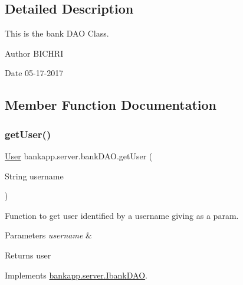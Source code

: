 \subsection{Detailed Description}
This is the bank D\+AO Class. 

\begin{DoxyAuthor}{Author}
B\+I\+C\+H\+RI 
\end{DoxyAuthor}
\begin{DoxyDate}{Date}
05-\/17-\/2017 
\end{DoxyDate}


\subsection{Member Function Documentation}
\mbox{\label{classbankapp_1_1server_1_1bankDAO_af952db62263ca6ebda3130336e63f941}} 
\subsubsection{\texorpdfstring{get\+User()}{getUser()}}
{\footnotesize\ttfamily \hyperlink{classbankapp_1_1server_1_1User}{User} bankapp.\+server.\+bank\+D\+A\+O.\+get\+User (\begin{DoxyParamCaption}\item[{String}]{username }\end{DoxyParamCaption})}



Function to get user identified by a username giving as a param. 


\begin{DoxyParams}{Parameters}
{\em username} & \\
\hline
\end{DoxyParams}
\begin{DoxyReturn}{Returns}
user 
\end{DoxyReturn}


Implements \hyperlink{interfacebankapp_1_1server_1_1IbankDAO_a11bbbf14695bce77b2932f36fdb79bd8}{bankapp.\+server.\+Ibank\+D\+AO}.

\mbox{\label{classbankapp_1_1server_1_1bankDAO_a0023f065d21c23dd9b952339fd832d7e}} 
